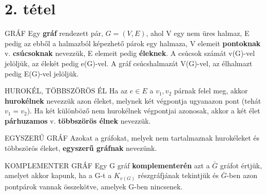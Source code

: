 \section{2. tétel}


\begin{definicio}{GRÁF}
Egy \textbf{gráf} rendezett pár, $G = (V,E)$, ahol V egy nem üres halmaz, E pedig az ebből a halmazból képezhető párok egy halmaza, V elemeit \textbf{pontoknak} v. \textbf{csúcsoknak} nevezzük, E elemeit pedig \textbf{éleknek}. A csúcsok számát v(G)-vel jelöljük, az élekét pedig e(G)-vel. A gráf csúcshalmazát V(G)-vel, az élhalmazt pedig E(G)-vel jelöljük.
\end{definicio}

\begin{definicio}{HUROKÉL, TÖBBSZÖRÖS ÉL}
Ha az $e \in E$ a {$v_1, v_2$} párnak felel meg, akkor \textbf{hurokélnek} nevezzük azon éleket, melynek két végpontja ugyanazon pont (tehát $v_1 = v_2$). Ha két különböző nem hurokélnek végpontjai azonosak, akkor a két élet \textbf{párhuzamos} v. \textbf{többszörös élnek} nevezzük.
\end{definicio}

\begin{definicio}{EGYSZERŰ GRÁF}
Azokat a gráfokat, melyek nem tartalmaznak hurokéleket és többszörös éleket, \textbf{egyszerű gráfnak} nevezünk.
\end{definicio}



\begin{definicio}{KOMPLEMENTER GRÁF}
Egy G gráf \textbf{komplementerén} azt a $\bar{G}$ gráfot értjük, amelyet akkor kapunk, ha a G-t a $K_{v(G)}$ részgráfjának tekintjük és $\bar{G}$-ben azon pontpárok vannak összekötve, amelyek G-ben nincsenek.
\end{definicio}

